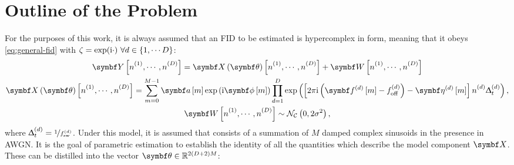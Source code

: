 \section{Outline of the Problem}
\label{sec:theory-outline}
For the purposes of this work, it is always assumed that an \ac{FID} to be
estimated is hypercomplex in form, meaning that it obeys
\eqref{eq:general-fid} with $\zeta = \exp(\mathrm{i} \cdot)\ \forall d \in \lbrace 1,
\cdots D \rbrace$:
\begin{subequations}
    \begin{gather}
        \bY \left[\none, \cdots, \nD\right] =
            \bX \left( \bth \right) \left[\none, \cdots, \nD\right] +
            \bW \left[\none, \cdots, \nD\right] \\
        \bX \left(\bth\right) \left[\none, \cdots, \nD\right] =
        \sum_{m=0}^{M-1} \bdam \exp\left(
                \iu \bdphim
            \right)
            \prod_{d=1}^D
            \exp\left(
                \left[ 2 \pi \iu \left(\bdfdm - \foffd\right) - \bdetadm \right] \nd \Dtd
            \right),
            \label{eq:x}
            \\
        \bW \left[\none, \cdots, \nD\right] \sim
            \mathcal{N_C}\left(0, 2\sigma^2\right),
    \end{gather}
    \label{eq:hypercomplex-fid}
\end{subequations}%
where $\Updelta_t^{(d)} = \nicefrac{1}{f_{\mathrm{sw}}^{(d)}}$. Under this model, it is assumed that
 consists of a summation of $M$ damped complex sinusoids in the
presence in \ac{AWGN}. It is the goal of parametric estimation to establish the
identity of all the quantities which describe the model component $\bX$. These
can be distilled into the vector $\bth \in \mathbb{R}^{2(D + 2)M}$:

